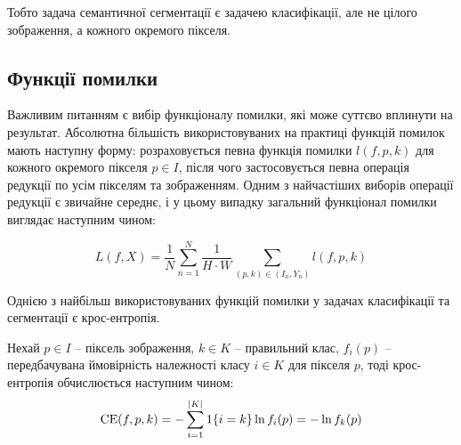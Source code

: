 Тобто задача семантичної сегментації є задачею класифікації, але
не цілого зображення, а кожного окремого пікселя.



\subsection{Функції помилки}

Важливим питанням є вибір функціоналу помилки, які може суттєво вплинути
на результат. Абсолютна більшість використовуваних на практиці
функцій помилок мають наступну форму: розраховується
певна функція помилки $l(f, p, k)$ для кожного окремого
пікселя $p \in I$, після чого застосовується певна операція редукції
по усім пікселям та зображенням. Одним з найчастіших
виборів операції редукції є звичайне середнє, і у цьому випадку
загальний функціонал помилки виглядає наступним чином:

\begin{equation} \label{eq:loss_reduction}
    L(f, X) = \frac{1}{N}
    \sum\limits_{n=1}^{N}
    \frac{1}{H \cdot W}
    \sum\limits_{(p, k) \in (I_n, Y_n)} l(f, p, k)
\end{equation}

Однією з найбільш використовуваних функцій помилки у задачах
класифікації та сегментації є крос-ентропія.

\begin{definition}\label{def:ce_loss}
    Нехай $p \in I$ -- піксель зображення, $k \in K$ -- правильний клас,
    $f_i(p)$ -- передбачувана ймовірність належності класу $i \in K$ для пікселя $p$, тоді крос-ентропія
    обчислюється наступним чином:
    \begin{equation*}
        \operatorname{CE}(f, p, k) = - \sum\limits_{i=1}^{|K|} \operatorname{1}\{i = k\} \ln f_i(p) = - \ln f_k(p)
    \end{equation*}
\end{definition}

